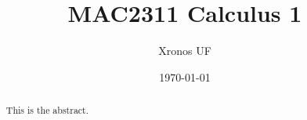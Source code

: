 \documentclass{xourse}
\title{MAC2311 Calculus 1}
\author{Xronos UF}
\date{\today}
\begin{document}
\begin{abstract}
	This is the abstract.
\end{abstract}

\maketitle

\tableofcontents

\end{document}
